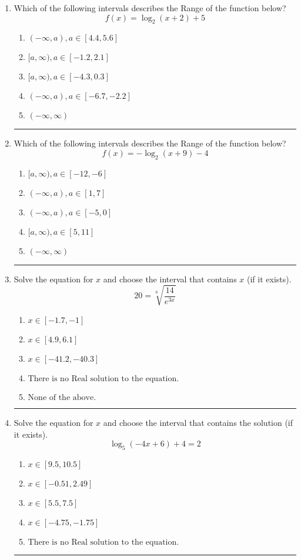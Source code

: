 \documentclass[14pt]{extbook}
\newcommand{\litem}[1]{\item#1\hspace*{-1cm}\rule{\textwidth}{0.4pt}}
\begin{document}
\begin{enumerate}
{\begin{enumerate}[label=\Alph*.]
\end{enumerate} }
\litem{
Which of the following intervals describes the Range of the function below?\[ f(x) = \log_2{(x+2)}+5 \]\begin{enumerate}[label=\Alph*.]
\item \( (-\infty, a), a \in [4.4, 5.6] \)
\item \( [a, \infty), a \in [-1.2, 2.1] \)
\item \( [a, \infty), a \in [-4.3, 0.3] \)
\item \( (-\infty, a), a \in [-6.7, -2.2] \)
\item \( (-\infty, \infty) \)

\end{enumerate} }
\litem{
Which of the following intervals describes the Range of the function below?\[ f(x) = -\log_2{(x+9)}-4 \]\begin{enumerate}[label=\Alph*.]
\item \( [a, \infty), a \in [-12, -6] \)
\item \( (-\infty, a), a \in [1, 7] \)
\item \( (-\infty, a), a \in [-5, 0] \)
\item \( [a, \infty), a \in [5, 11] \)
\item \( (-\infty, \infty) \)

\end{enumerate} }
\litem{
 Solve the equation for $x$ and choose the interval that contains $x$ (if it exists).\[  20 = \sqrt[6]{\frac{14}{e^{3x}}} \]\begin{enumerate}[label=\Alph*.]
\item \( x \in [-1.7, -1] \)
\item \( x \in [4.9, 6.1] \)
\item \( x \in [-41.2, -40.3] \)
\item \( \text{There is no Real solution to the equation.} \)
\item \( \text{None of the above.} \)

\end{enumerate} }
\litem{
Solve the equation for $x$ and choose the interval that contains the solution (if it exists).\[ \log_{5}{(-4x+6)}+4 = 2 \]\begin{enumerate}[label=\Alph*.]
\item \( x \in [9.5, 10.5] \)
\item \( x \in [-0.51, 2.49] \)
\item \( x \in [5.5, 7.5] \)
\item \( x \in [-4.75, -1.75] \)
\item \( \text{There is no Real solution to the equation.} \)


\end{enumerate}}
\end{enumerate}
\end{document}
